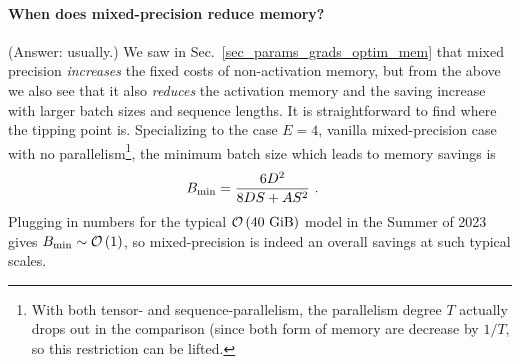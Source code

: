 \documentclass[11pt]{article}
\begin{document}
\paragraph{When does mixed-precision reduce memory?} (Answer: usually.) We saw in Sec.~\ref{sec_params_grads_optim_mem}
that mixed precision \textit{increases} the fixed costs of non-activation memory, but from the above
we also see that it also \textit{reduces} the activation memory and the saving increase with larger
batch sizes and sequence lengths. It is straightforward to find where the tipping point is.
Specializing to the case $E=4$, vanilla mixed-precision case with no parallelism\footnote{With both
	tensor- and sequence-parallelism, the parallelism degree $ T $ actually drops out in the comparison
	(since both form of memory are decrease by $ 1/T $, so this restriction  can be lifted.}, the
minimum batch size which leads to memory savings is
\begin{align}
	B _{ {\rm min}  } & = \frac{ 6 D ^{ 2 } }{ 8 DS + A S ^{ 2 } }\label{eq_min_mp_batch_size}\ .
\end{align}
Plugging in numbers for the typical $ \mathcal{O} \left( 40 \ {\rm GiB} \right)$ model in the Summer of
2023 gives $ B _{ {\rm min} } \sim \mathcal{O} \left( 1\right)  $, so mixed-precision is indeed an overall
savings at such typical scales.
\end{document}
